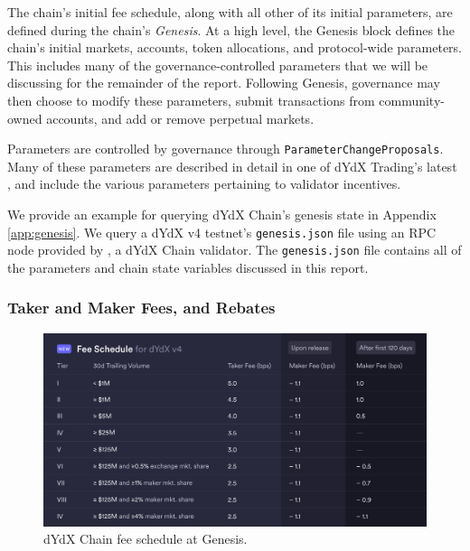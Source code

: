             The chain's initial fee schedule, along with all other of its initial parameters, are defined during the chain's \textit{Genesis}. At a high level, the Genesis block defines the chain's initial markets, accounts, token allocations, and protocol-wide parameters. This includes many of the governance-controlled parameters that we will be discussing for the remainder of the report. Following Genesis, governance may then choose to modify these parameters, submit transactions from community-owned accounts, and add or remove perpetual markets. 

            Parameters are controlled by governance through \texttt{ParameterChangeProposals}. Many of these parameters are described in detail in one of dYdX Trading's latest , and include the various parameters pertaining to validator incentives. 

            We provide an example for querying dYdX Chain's genesis state in Appendix \ref{app:genesis}. We query a dYdX v4 testnet's  \texttt{genesis.json} file using an RPC node provided by , a dYdX Chain validator. The \texttt{genesis.json} file contains all of the parameters and chain state variables discussed in this report.

        \subsubsection{Taker and Maker Fees, and Rebates}

            \begin{figure}[htp]
                \centering
                \includegraphics[width=0.7\linewidth]{figs/fees_schedule.png}
                \caption{dYdX Chain fee schedule at Genesis.}
                \label{fig:schedule}
            \end{figure}

